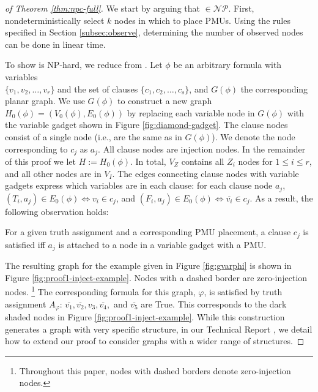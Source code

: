 \begin{proof}[of Theorem \ref{thm:npc-full}]
We start by arguing that \full $\in \mathcal{NP}$. First, nondeterministically select $k$ nodes in which to place PMUs. Using the rules specified in Section \ref{subsec:observe}, determining
the number of observed nodes can be done in linear time.

To show \full is NP-hard, we reduce from \sats.  Let $\phi$ be an arbitrary \sat formula with variables \\
$\{v_1,v_2, \dots , v_r\}$ and the set of clauses $\{c_1,c_2,\dots , c_s \}$, and $G(\phi)$ the corresponding planar graph. We use $G(\phi)$ to construct a new graph $H_0(\phi) = (V_0(\phi), E_0(\phi))$ by replacing each variable
node in $G(\phi)$ with the variable gadget shown in Figure \ref{fig:diamond-gadget}. The clause nodes consist of a single node (i.e., are the same
as in $G(\phi)$). We denote the node corresponding to $c_j$ as $a_j$. All clause nodes are injection nodes.  In the remainder of this proof we let $H := H_0(\phi)$.
In total, $V_Z$ contains all $Z_i$ nodes for $1 \leq i \leq r$, and all other nodes are in $V_I$.  The edges connecting clause nodes with variable gadgets express which variables are in each clause: for each clause node $a_j$, $(T_i, a_j)\in E_0(\phi) \Leftrightarrow v_i\in c_j$, and $(F_i, a_j)\in E_0(\phi) \Leftrightarrow \overline{v_i}\in c_j$. As a result, the following observation holds:

\begin{observation}\label{obs:1}
For a given truth assignment and a corresponding PMU placement, a clause $c_j$ is satisfied iff $a_j$ is attached to a node in a variable gadget with a PMU. 
\end{observation}


The resulting graph for the example given in Figure \ref{fig:gvarphi} is shown in Figure \ref{fig:proof1-inject-example}.  Nodes with a dashed border are zero-injection nodes. 
{\footnote {\small  Throughout this paper, nodes with dashed borders denote zero-injection nodes. }} 
The corresponding formula for this graph, $\varphi$,
is satisfied by truth assignment $A_{\varphi}$: $\overline{v_1}, \overline{v_2}, v_3, \overline{v_4},$ and $\overline{v_5}$ are True. This corresponds to the dark shaded nodes in Figure
\ref{fig:proof1-inject-example}. While this construction generates a graph with very specific structure, in our Technical Report \cite{Tech12}, we detail how to 
extend our proof to consider graphs with a wider range of structures.%



\end{proof}
